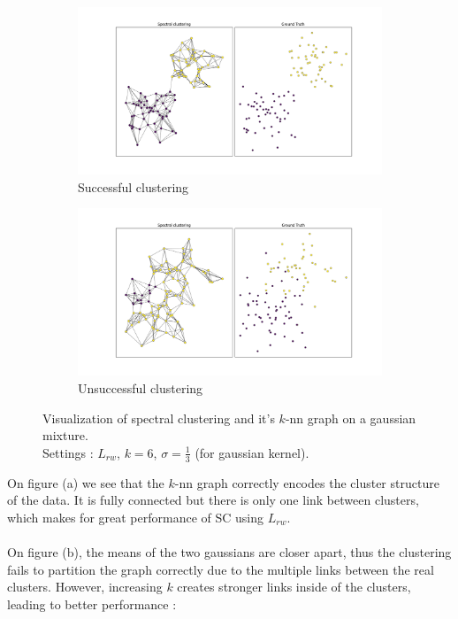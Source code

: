 \documentclass[a4paper,12pt]{article}
\theoremstyle{definition}
\theoremstyle{plain}
\begin{document}
\begin{figure}[H]
	\captionsetup{justification=centering}
	\begin{subfigure}{.6\textwidth}
		\centering
		\includegraphics[width=0.9\linewidth]{figures/fig5_g1}
		\caption{Successful clustering}
	\end{subfigure}
	\begin{subfigure}{.6\textwidth}
		\centering
		\includegraphics[width=0.9\linewidth]{figures/fig6_g2}
		\caption{Unsuccessful clustering}
	\end{subfigure}
	\caption{Visualization of spectral clustering and it's $k$-nn graph on a gaussian mixture. \\ Settings : $L_{rw}$, $k=6$, $\sigma=\frac{1}{3}$ (for gaussian kernel).}
\end{figure}
On figure (a) we see that the $k$-nn graph correctly encodes the cluster structure of the data. It is fully connected but there is only one link between clusters, which makes for great performance of SC using $L_{rw}$. \\ \\
On figure (b), the means of the two gaussians are closer apart, thus the clustering fails to partition the graph correctly due to the multiple links between the real clusters.
However, increasing $k$ creates stronger links inside of the clusters, leading to better performance : 
\end{document}
